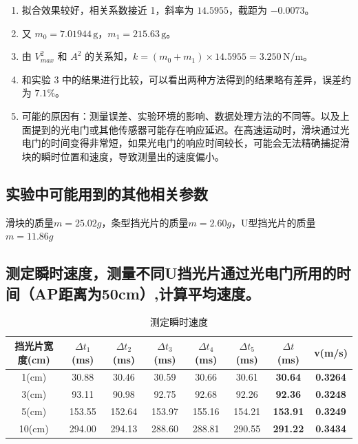 \documentclass[UTF8]{article}
\theoremstyle{MyLineTheoremStyle} %
\theoremstyle{MyBlockTheoremStyle} %
\theoremstyle{MySubsubsectionStyle} %
\begin{document}
\begin{enumerate}
    \item 拟合效果较好，相关系数接近 1，斜率为 $14.5955$，截距为 $-0.0073$。
    \item 又 $m_0 = 7.01944 \, \text{g}$，$m_1 = 215.63 \, \text{g}$。
    \item 由 $V_{max}^2$ 和 $A^2$ 的关系知，$k = (m_0 + m_1) \times 14.5955 = 3.250 \, \text{N/m}$。
    \item 和实验 3 中的结果进行比较，可以看出两种方法得到的结果略有差异，误差约为 $7.1\%$。
    \item 可能的原因有：测量误差、实验环境的影响、数据处理方法的不同等。以及上面提到的光电门或其他传感器可能存在响应延迟。在高速运动时，滑块通过光电门的时间变得非常短，如果光电门的响应时间较长，可能会无法精确捕捉滑块的瞬时位置和速度，导致测量出的速度偏小。
\end{enumerate}


\subsection{实验中可能用到的其他相关参数}
滑块的质量$m=25.02g$，条型挡光片的质量$m=2.60g$，U型挡光片的质量$m=11.86g$


\subsection{测定瞬时速度，测量不同U挡光片通过光电门所用的时间（AP距离为50cm）,计算平均速度。}

\begin{table}[H]
    \centering
    \begin{tabular}{|c|c|c|c|c|c|c|c|}
        \hline
        挡光片宽度(cm) & $\Delta t_1$(ms) & $\Delta t_2$(ms) & $\Delta t_3$(ms) & $\Delta t_4$(ms) & $\Delta t_5$(ms) & $\Delta t$(ms) & v(m/s)\\
        \hline
        1(cm) & 30.88 & 30.46 & 30.59 & 30.66 & 30.61 & \textbf{30.64} & \textbf{0.3264}\\
        \hline
        3(cm) & 93.11 & 90.98 & 92.75 & 92.68 & 92.26 & \textbf{92.36} & \textbf{0.3248}\\
        \hline
        5(cm) & 153.55 & 152.64 & 153.97 & 155.16 & 154.21 & \textbf{153.91} & \textbf{0.3249}\\
        \hline
        10(cm) & 294.00 & 294.13 & 288.60 & 288.81 & 290.55 & \textbf{291.22} & \textbf{0.3434}\\
        \hline		
    \end{tabular}
    \caption{\small 测定瞬时速度}
\end{table}
\end{document}
